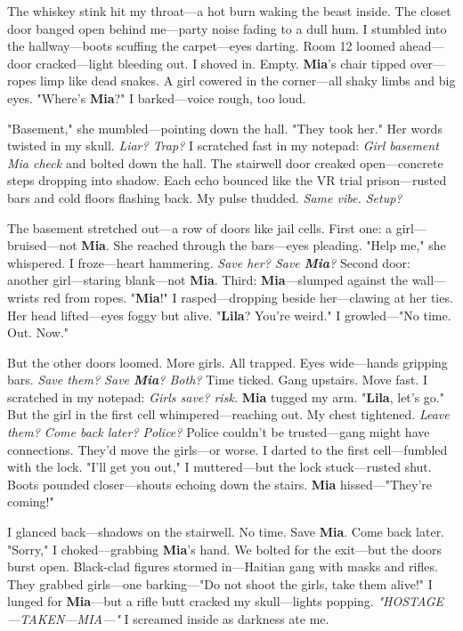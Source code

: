 \documentclass{article}
\begin{document}
The whiskey stink hit my throat—a hot burn waking the beast inside. The closet door banged open behind me—party noise fading to a dull hum. I stumbled into the hallway—boots scuffing the carpet—eyes darting. Room 12 loomed ahead—door cracked—light bleeding out. I shoved in. Empty. \textbf{Mia}’s chair tipped over—ropes limp like dead snakes. A girl cowered in the corner—all shaky limbs and big eyes. "Where’s \textbf{Mia}?" I barked—voice rough, too loud.

"Basement," she mumbled—pointing down the hall. "They took her." Her words twisted in my skull. \textit{Liar? Trap?} I scratched fast in my notepad: \textit{Girl basement Mia check} and bolted down the hall. The stairwell door creaked open—concrete steps dropping into shadow. Each echo bounced like the VR trial prison—rusted bars and cold floors flashing back. My pulse thudded. \textit{Same vibe. Setup?}

The basement stretched out—a row of doors like jail cells. First one: a girl—bruised—not \textbf{Mia}. She reached through the bars—eyes pleading. "Help me," she whispered. I froze—heart hammering. \textit{Save her? Save \textbf{Mia}?} Second door: another girl—staring blank—not \textbf{Mia}. Third: \textbf{Mia}—slumped against the wall—wrists red from ropes. "\textbf{Mia}!" I rasped—dropping beside her—clawing at her ties. Her head lifted—eyes foggy but alive. "\textbf{Lila}? You’re weird." I growled—"No time. Out. Now."

But the other doors loomed. More girls. All trapped. Eyes wide—hands gripping bars. \textit{Save them? Save \textbf{Mia}? Both?} Time ticked. Gang upstairs. Move fast. I scratched in my notepad: \textit{Girls save? risk.} \textbf{Mia} tugged my arm. "\textbf{Lila}, let’s go." But the girl in the first cell whimpered—reaching out. My chest tightened. \textit{Leave them? Come back later? Police?} Police couldn’t be trusted—gang might have connections. They’d move the girls—or worse. I darted to the first cell—fumbled with the lock. "I’ll get you out," I muttered—but the lock stuck—rusted shut. Boots pounded closer—shouts echoing down the stairs. \textbf{Mia} hissed—"They’re coming!"

I glanced back—shadows on the stairwell. No time. Save \textbf{Mia}. Come back later. "Sorry," I choked—grabbing \textbf{Mia}’s hand. We bolted for the exit—but the doors burst open. Black-clad figures stormed in—Haitian gang with masks and rifles. They grabbed girls—one barking—"Do not shoot the girls, take them alive!" I lunged for \textbf{Mia}—but a rifle butt cracked my skull—lights popping. \textit{"HOSTAGE—TAKEN—MIA—"} I screamed inside as darkness ate me.
\end{document}
